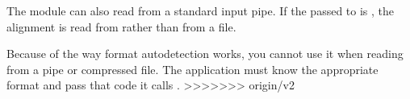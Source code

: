 The module can also read from a standard input pipe. If the
 passed to  is \ccode{-},
the alignment is read from  rather than from a file.

Because of the way format autodetection works, you cannot use it when
reading from a pipe or compressed file. The application must know the
appropriate format and pass that code it calls
.
>>>>>>> origin/v2
